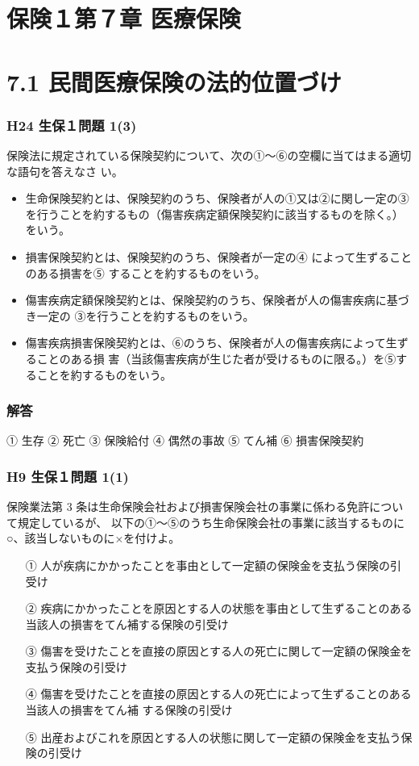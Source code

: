 \documentclass[report,gutter=10mm,fore-edge=10mm,uplatex,dvipdfmx]{jlreq}
\begin{document}
\section{保険１第７章 医療保険}
\section{7.1 民間医療保険の法的位置づけ}

\subsubsection{H24 生保１問題 1(3)
}
保険法に規定されている保険契約について、次の①～⑥の空欄に当てはまる適切な語句を答えなさ
い。
\begin{itemize}
 \item 生命保険契約とは、保険契約のうち、保険者が人の①又は②に関し一定の③を行うことを約するもの（傷害疾病定額保険契約に該当するものを除く。）をいう。
 \item 損害保険契約とは、保険契約のうち、保険者が一定の④
によって生ずることのある損害を⑤
することを約するものをいう。
 \item 傷害疾病定額保険契約とは、保険契約のうち、保険者が人の傷害疾病に基づき一定の
③を行うことを約するものをいう。
 \item 傷害疾病損害保険契約とは、⑥のうち、保険者が人の傷害疾病によって生ずることのある損
害（当該傷害疾病が生じた者が受けるものに限る。）を⑤することを約するものをいう。
\end{itemize}

\subsubsection{解答}

① 生存
② 死亡
③ 保険給付
④ 偶然の事故
⑤ てん補
⑥ 損害保険契約

\subsubsection{H9 生保１問題 1(1)}
保険業法第 3 条は生命保険会社および損害保険会社の事業に係わる免許について規定しているが、
以下の①～⑤のうち生命保険会社の事業に該当するものに○、該当しないものに×を付けよ。

\begin{itemize}
 \item [①] 人が疾病にかかったことを事由として一定額の保険金を支払う保険の引受け
 \item [②]
疾病にかかったことを原因とする人の状態を事由として生ずることのある当該人の損害をてん補する保険の引受け
 \item [③]
傷害を受けたことを直接の原因とする人の死亡に関して一定額の保険金を支払う保険の引受け
 \item [④]
傷害を受けたことを直接の原因とする人の死亡によって生ずることのある当該人の損害をてん補
する保険の引受け
 \item [⑤]
出産およびこれを原因とする人の状態に関して一定額の保険金を支払う保険の引受け
\end{itemize}
\end{document}
